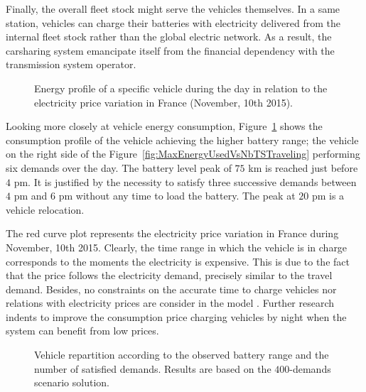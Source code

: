 Finally, the overall fleet stock might serve the vehicles themselves.
In a same station, vehicles can charge their batteries with electricity delivered from the internal fleet stock rather than the global electric network.
As a result, the carsharing system emancipate itself from the financial dependency with the transmission system operator.


\begin{figure}[p]
\flushleft

\caption{Energy profile of a specific vehicle during the day in relation to the electricity price variation in France (November, 10th 2015).}
\label{fig:plotProfileV4}
\end{figure}

\bigskip
Looking more closely at vehicle energy consumption, Figure~\ref{fig:plotProfileV4} shows the consumption profile of the vehicle achieving the higher battery range; \ie the vehicle on the right side of the {Figure~\ref{fig:MaxEnergyUsedVsNbTSTraveling}} performing six demands over the day.
The battery level peak of $75$ km is reached just before $4$ pm.
It is justified by the necessity to satisfy three successive demands between $4$ pm and $6$ pm without any time to load the battery.
The peak at $20$ pm is a vehicle relocation.

The red curve plot represents the electricity price variation in France during November, 10th 2015.
Clearly, the time range in which the vehicle is in charge corresponds to the moments the electricity is expensive.
This is due to the fact that the price follows the electricity demand, precisely similar to the travel demand.
Besides, no constraints on the accurate time to charge vehicles nor relations with electricity prices are consider in the model {\ENERGY}.
Further research indents to improve the consumption price charging vehicles by night when the system can benefit from low prices.

\begin{figure}[p]
\flushleft

\caption{Vehicle repartition according to the observed battery range and the number of satisfied demands. Results are based on the $400$-demands scenario solution.}
\label{fig:plotD400MaxEnergyUsedVsNbSatisfiedDemands}
\end{figure}

